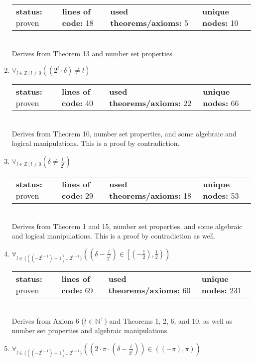 \documentclass{article}[12pt]
\begin{document}
\begin{enumerate}
  \begin{tabular}{l | l | l | l}
    \textbf{status:} proven & \textbf{lines of code:} 18 & \textbf{used theorems/axioms:} 5 & \textbf{unique nodes:} 10
  \end{tabular} \hfill \\
Derives from Theorem 13 and number set properties.
\item $\forall_{l \in \mathbb{Z}~|~l \neq 0} \left(\left(2^{t} \cdot \delta\right) \neq l\right)$ \hfill \\
  \begin{tabular}{l | l | l | l}
    \textbf{status:} proven & \textbf{lines of code:} 40 & \textbf{used theorems/axioms:} 22 & \textbf{unique nodes:} 66
  \end{tabular} \hfill \\
Derives from Theorem 10, number set properties, and some algebraic and logical manipulations.  This is a proof by contradiction.
\item $\forall_{l \in \mathbb{Z}~|~l \neq 0} \left(\delta \neq \frac{l}{2^{t}}\right)$ \hfill \\
  \begin{tabular}{l | l | l | l}
    \textbf{status:} proven & \textbf{lines of code:} 29 & \textbf{used theorems/axioms:} 18 & \textbf{unique nodes:} 53
  \end{tabular} \hfill \\
Derives from Theorem 1 and 15, number set properties, and some algebraic and logical manipulations.  This is a proof by contradiction as well.
\item $\forall_{l \in \{\left(\left(-2^{t - 1}\right) + 1\right)\ldots 2^{t - 1}\}} \left(\left(\delta - \frac{l}{2^{t}}\right) \in \left[\left(-\frac{1}{2}\right),\frac{1}{2}\right)\right)$ \hfill \\
  \begin{tabular}{l | l | l | l}
    \textbf{status:} proven & \textbf{lines of code:} 69 & \textbf{used theorems/axioms:} 60 & \textbf{unique nodes:} 231
  \end{tabular} \hfill \\
Derives from Axiom 6 ($t \in \mathbb{N}^+$) and Theorems 1, 2, 6, and 10, as well as number set properties and algebraic manipulations. 
\item $\forall_{l \in \{\left(\left(-2^{t - 1}\right) + 1\right)\ldots 2^{t - 1}\}} \left(\left(2 \cdot \pi \cdot \left(\delta - \frac{l}{2^{t}}\right)\right) \in \left(\left(-\pi\right),\pi\right)\right)$ \hfill \\

\end{enumerate}
\end{document}
